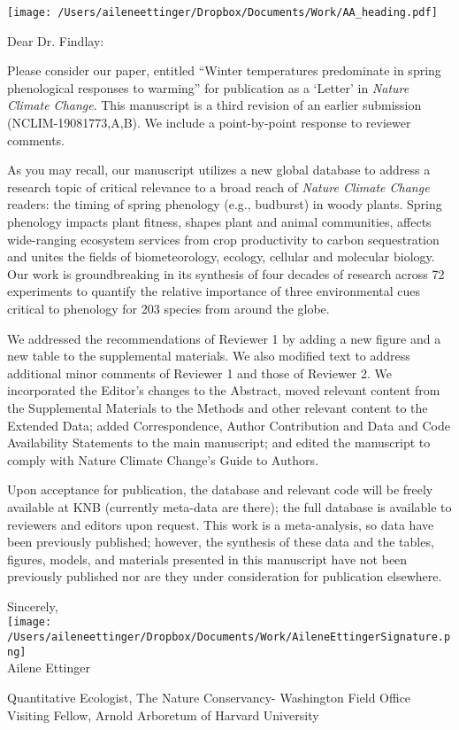 \documentclass[11.5pt,a4paper]{letter}
\begin{document}
\begin{letter}{}
\texttt{[image: /Users/aileneettinger/Dropbox/Documents/Work/AA\_heading.pdf]}

\opening{Dear Dr. Findlay:}
Please consider our paper, entitled ``Winter temperatures predominate in spring phenological responses to warming'' for publication as a `Letter' in \emph{Nature Climate Change}. This manuscript is a third revision of an earlier submission (NCLIM-19081773,A,B). We include a point-by-point response to reviewer comments. 

\par As you may recall, our manuscript utilizes a new global database to address a research topic of critical relevance to a broad reach of \emph{Nature Climate Change} readers:  the timing of spring phenology (e.g., budburst) in woody plants. Spring phenology impacts plant fitness, shapes plant and animal communities, affects wide-ranging ecosystem services from crop productivity to carbon sequestration and unites the fields of biometeorology, ecology, cellular and molecular biology. Our work is groundbreaking in its synthesis of four decades of research across 72 experiments to quantify the relative importance of three environmental cues critical to phenology for 203 species from around the globe. 

\par We addressed the recommendations of Reviewer 1 by adding a new figure and a new table to the supplemental materials. We also modified text to address additional minor comments of Reviewer 1 and those of Reviewer 2. We incorporated the Editor's changes to the Abstract, moved relevant content from the Supplemental Materials to the Methods and other relevant content to the Extended Data; added Correspondence, Author Contribution and Data and Code Availability Statements to the main manuscript; and edited the manuscript to comply with Nature Climate Change's Guide to Authors.

\par Upon acceptance for publication, the database and relevant code will be freely available at KNB (currently meta-data are there); the full database is available to reviewers and editors upon request. This work is a meta-analysis, so data have been previously published; however, the synthesis of these data and the tables, figures, models, and materials presented in this manuscript have not been previously published nor are they under consideration for publication elsewhere.

Sincerely,\\

\texttt{[image: /Users/aileneettinger/Dropbox/Documents/Work/AileneEttingerSignature.png]} \\
Ailene Ettinger\\
\begin{footnotesize}
Quantitative Ecologist, The Nature Conservancy- Washington Field Office\\
Visiting Fellow, Arnold Arboretum of Harvard University 
\end{footnotesize}

\end{letter}
\end{document}

